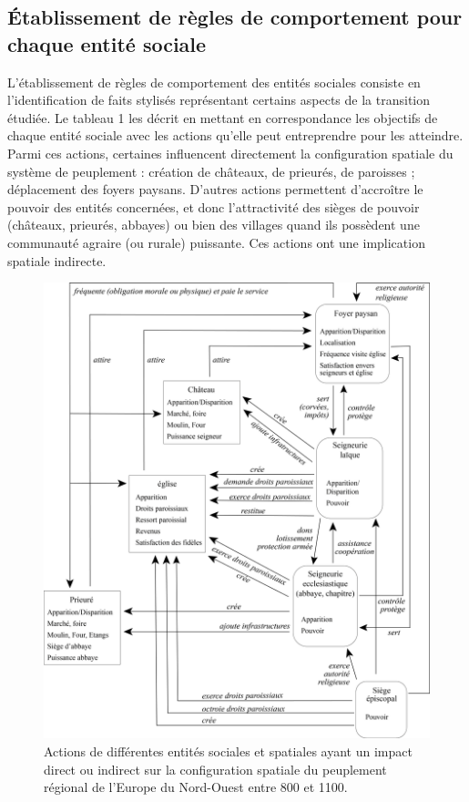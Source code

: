 \documentclass[12pt, a4paper, oneside]{book}
\begin{document}
	\subsection{Établissement de règles de comportement pour chaque entité sociale}
	
	L'établissement de règles de comportement des entités sociales consiste en l'identification de faits stylisés représentant certains aspects de la transition étudiée.
	Le tableau 1 les décrit en mettant en correspondance les objectifs de chaque entité sociale avec les actions qu'elle peut entreprendre pour les atteindre.
	Parmi ces actions, certaines influencent directement la configuration spatiale du système de peuplement : création de châteaux, de prieurés, de paroisses ; déplacement des foyers paysans.
	D'autres actions permettent d'accroître le pouvoir des entités concernées, et donc l'attractivité des sièges de pouvoir (châteaux, prieurés, abbayes) ou bien des villages quand ils possèdent une communauté agraire (ou rurale) puissante.
	Ces actions ont une implication spatiale indirecte.
	
	\begin{figure}[!h]
		\centering
		\includegraphics[width=1\linewidth]{src/Chapitre_TMD/Fig1}
		\caption{Actions de différentes entités sociales et spatiales ayant un impact direct ou indirect sur la configuration spatiale du peuplement régional de l’Europe du Nord-Ouest entre 800 et 1100.}
		\label{fig:fig1}
	\end{figure}
	
\end{document}
